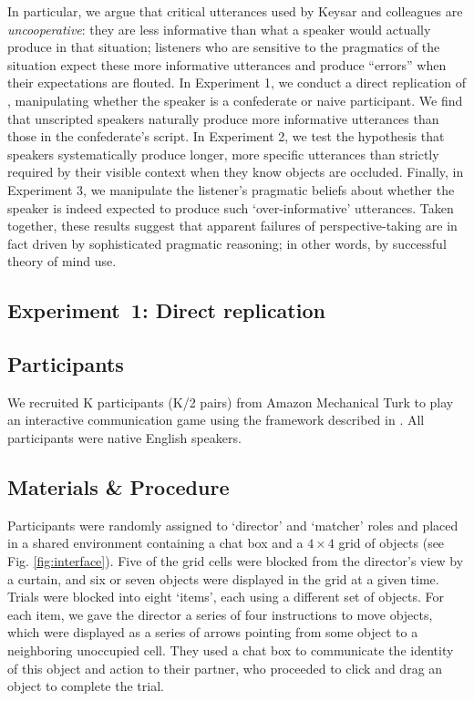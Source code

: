 \documentclass[manuscript]{stjour}
\begin{document}
In particular, we argue that critical utterances used by Keysar and colleagues are \emph{uncooperative}: they are less informative than what a speaker would actually produce in that situation; listeners who are sensitive to the pragmatics of the situation expect these more informative utterances and produce ``errors'' when their expectations are flouted. In Experiment 1, we conduct a direct replication of \cite{KeysarLinBarr03_LimitsOnTheoryOfMindUse}, manipulating whether the speaker is a confederate or naive participant. We find that unscripted speakers naturally produce more informative utterances than those in the confederate's script. In Experiment 2, we test the hypothesis that speakers systematically produce longer, more specific utterances than strictly required by their visible context when they know objects are occluded. Finally, in Experiment 3, we manipulate the listener's pragmatic beliefs about whether the speaker is indeed expected to produce such `over-informative' utterances. Taken together, these results suggest that apparent failures of perspective-taking are in fact driven by sophisticated pragmatic reasoning; in other words, by successful theory of mind use.

\subsection{Experiment~1: Direct replication}
\label{sec:Exp1}

\subsection{Participants}

We recruited K participants (K/2 pairs) from Amazon Mechanical Turk to play an interactive communication game using the framework described in \cite{Hawkins15_RealTimeWebExperiments}. All participants were native English speakers. %

\subsection{Materials \& Procedure}

Participants were randomly assigned to `director' and `matcher' roles and placed in a shared environment containing a chat box and a $4 \times 4$ grid of objects (see Fig. \ref{fig:interface}). Five of the grid cells were blocked from the director's view by a curtain, and six or seven objects were displayed in the grid at a given time. Trials were blocked into eight `items', each using a different set of objects. For each item, we gave the director a series of four instructions to move objects, which were displayed as a series of arrows pointing from some object to a neighboring unoccupied cell. They used a chat box to communicate the identity of this object and action to their partner, who proceeded to click and drag an object to complete the trial. 
\end{document}
